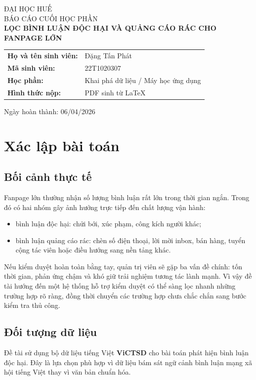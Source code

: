 \documentclass[12pt,a4paper]{article}
\begin{document}
\begin{titlepage}
    \centering
    {\large ĐẠI HỌC HUẾ \\[0.3cm]}
    {\large BÁO CÁO CUỐI HỌC PHẦN \\[0.8cm]}
    {\Large \textbf{LỌC BÌNH LUẬN ĐỘC HẠI VÀ QUẢNG CÁO RÁC CHO FANPAGE LỚN} \\[1.0cm]}

    \begin{tabular}{>{\bfseries}p{4.2cm}p{9cm}}
        Họ và tên sinh viên: & Đặng Tấn Phát \\
        Mã sinh viên: & 22T1020307 \\
        Học phần: & Khai phá dữ liệu / Máy học ứng dụng \\
        Hình thức nộp: & PDF sinh từ \LaTeX \\
    \end{tabular}

    \vfill

    {\large Ngày hoàn thành: 06/04/2026}
\end{titlepage}

\section{Xác lập bài toán}

\subsection{Bối cảnh thực tế}
Fanpage lớn thường nhận số lượng bình luận rất lớn trong thời gian ngắn. Trong đó có hai nhóm gây ảnh hưởng trực tiếp đến chất lượng vận hành:
\begin{itemize}[leftmargin=1.2cm]
    \item bình luận độc hại: chửi bới, xúc phạm, công kích người khác;
    \item bình luận quảng cáo rác: chèn số điện thoại, lời mời inbox, bán hàng, tuyển cộng tác viên hoặc điều hướng sang nền tảng khác.
\end{itemize}

Nếu kiểm duyệt hoàn toàn bằng tay, quản trị viên sẽ gặp ba vấn đề chính: tốn thời gian, phản ứng chậm và khó giữ trải nghiệm tương tác lành mạnh. Vì vậy đề tài hướng đến một hệ thống hỗ trợ kiểm duyệt có thể sàng lọc nhanh những trường hợp rõ ràng, đồng thời chuyển các trường hợp chưa chắc chắn sang bước kiểm tra thủ công.

\subsection{Đối tượng dữ liệu}
Đề tài sử dụng bộ dữ liệu tiếng Việt \textbf{ViCTSD} cho bài toán phát hiện bình luận độc hại. Đây là lựa chọn phù hợp vì dữ liệu bám sát ngữ cảnh bình luận mạng xã hội tiếng Việt thay vì văn bản chuẩn hóa.
\end{document}
